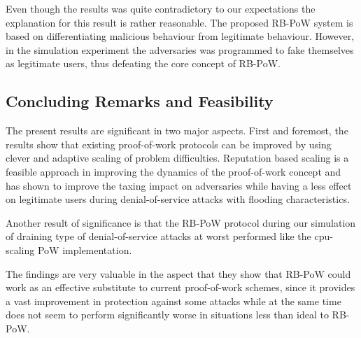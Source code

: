 Even though the results was quite contradictory to our expectations the explanation for this result is rather reasonable. The proposed RB-PoW system is based on differentiating malicious behaviour from legitimate behaviour. However, in the simulation experiment the adversaries was programmed to fake themselves as legitimate users, thus defeating the core concept of RB-PoW.


\subsection{Concluding Remarks and Feasibility}
The present results are significant in two major aspects. First and foremost, the results show that existing proof-of-work protocols can be improved by using clever and adaptive scaling of problem difficulties. Reputation based scaling is a feasible approach in improving the dynamics of the proof-of-work concept and has shown to improve the taxing impact on adversaries while having a less effect on legitimate users during denial-of-service attacks with flooding characteristics. 

Another result of significance is that the RB-PoW protocol during our simulation of draining type of denial-of-service attacks at worst performed like the cpu-scaling PoW implementation. 

The findings are very valuable in the aspect that they show that RB-PoW could work as an effective substitute to current proof-of-work schemes, since it provides a vast improvement in protection against some attacks while at the same time does not seem to perform significantly worse in situations less than ideal to RB-PoW. 


